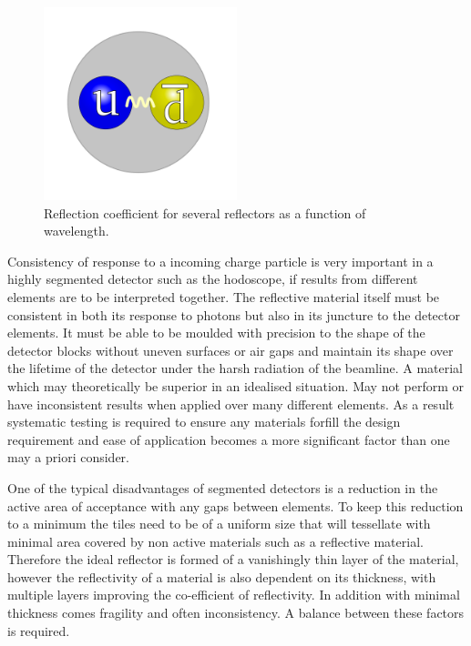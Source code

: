 \begin{figure}[!ht]
	\centering
	\includegraphics[width=0.5\textwidth]{ImgChap1/Meson2}
	\caption{Reflection coefficient for several reflectors as a function of wavelength.  \cite{janecek2012reflectivity}}
	\label{ReflCoef}
\end{figure}

Consistency of response to a incoming charge particle is very important in a highly segmented detector such as the hodoscope, if results from different elements are to be interpreted together. The reflective material itself must be consistent in both its response to photons but also in its juncture to the detector elements. It must be able to be moulded with precision to the shape of the detector blocks without uneven surfaces or air gaps and maintain its shape over the lifetime of the detector under the harsh radiation of the beamline. A material which may theoretically be superior in an idealised situation. May not perform or have inconsistent results when applied over many different elements. As a result systematic testing is required to ensure any materials forfill the design requirement and ease of application becomes a more significant factor than one may a priori consider.

One of the typical disadvantages of segmented detectors is a reduction in the active area of acceptance with any gaps between elements. To keep this reduction to a minimum the tiles need to be of a uniform size that will tessellate with minimal area covered by non active materials such as a reflective material. Therefore the ideal reflector is formed of a vanishingly thin layer of the material, however the reflectivity of a material is also dependent on its thickness, with multiple layers improving the co-efficient of reflectivity. In addition with minimal thickness comes fragility and often inconsistency. A balance between these factors is required.


